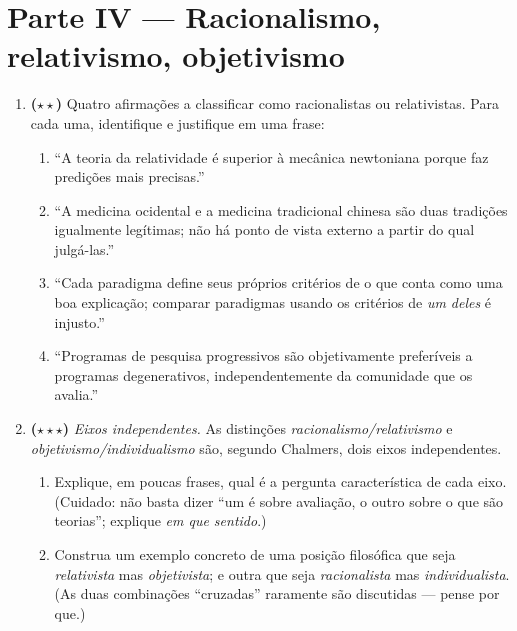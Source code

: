 \documentclass[10pt,a4paper]{extarticle}
\newcommand{\impt}[1]{\textcolor{important}{#1}}
\newcommand{\difii}{$\star\star$}
\newcommand{\difiii}{$\star\star\star$}
\begin{document}
\section*{Parte IV --- Racionalismo, relativismo, objetivismo}

\begin{enumerate}[label=\textbf{\arabic*.}, leftmargin=*, start=17]

\item \textbf{(\difii)} Quatro afirmações a classificar como \impt{racionalistas} ou \impt{relativistas}. Para cada uma, identifique e justifique em uma frase:

\begin{enumerate}[label=(\alph*)]
    \item ``A teoria da relatividade é superior à mecânica newtoniana porque faz predições mais precisas.''
    \item ``A medicina ocidental e a medicina tradicional chinesa são duas tradições igualmente legítimas; não há ponto de vista externo a partir do qual julgá-las.''
    \item ``Cada paradigma define seus próprios critérios de o que conta como uma boa explicação; comparar paradigmas usando os critérios de \emph{um deles} é injusto.''
    \item ``Programas de pesquisa progressivos são objetivamente preferíveis a programas degenerativos, independentemente da comunidade que os avalia.''
\end{enumerate}

\item \textbf{(\difiii)} \emph{Eixos independentes.} As distinções \emph{racionalismo/relativismo} e \emph{objetivismo/individualismo} são, segundo Chalmers, dois eixos independentes.

\begin{enumerate}[label=(\alph*)]
    \item Explique, em poucas frases, qual é a pergunta característica de cada eixo. (Cuidado: não basta dizer ``um é sobre avaliação, o outro sobre o que são teorias''; explique \emph{em que sentido}.)
    \item Construa um exemplo concreto de uma posição filosófica que seja \emph{relativista} mas \emph{objetivista}; e outra que seja \emph{racionalista} mas \emph{individualista}. (As duas combinações ``cruzadas'' raramente são discutidas --- pense por que.)
\end{enumerate}


\end{enumerate}
\end{document}
